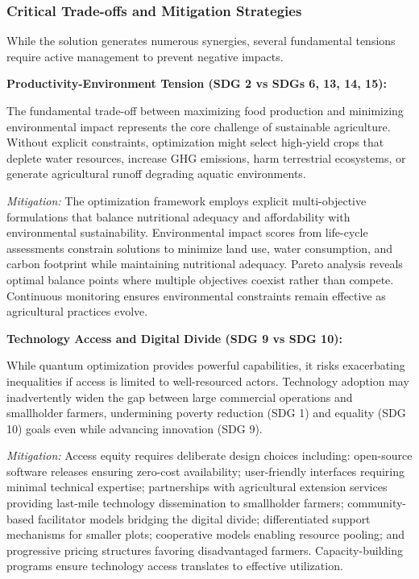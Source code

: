 \documentclass{oqireport}
\begin{document}
\subsubsection{Critical Trade-offs and Mitigation Strategies}

While the solution generates numerous synergies, several fundamental tensions require active management to prevent negative impacts.

\textbf{Productivity-Environment Tension (SDG 2 vs SDGs 6, 13, 14, 15):}

The fundamental trade-off between maximizing food production and minimizing environmental impact represents the core challenge of sustainable agriculture. Without explicit constraints, optimization might select high-yield crops that deplete water resources, increase GHG emissions, harm terrestrial ecosystems, or generate agricultural runoff degrading aquatic environments.

\textit{Mitigation:} The optimization framework employs explicit multi-objective formulations that balance nutritional adequacy and affordability with environmental sustainability. Environmental impact scores from life-cycle assessments constrain solutions to minimize land use, water consumption, and carbon footprint while maintaining nutritional adequacy. Pareto analysis reveals optimal balance points where multiple objectives coexist rather than compete. Continuous monitoring ensures environmental constraints remain effective as agricultural practices evolve.

\textbf{Technology Access and Digital Divide (SDG 9 vs SDG 10):}

While quantum optimization provides powerful capabilities, it risks exacerbating inequalities if access is limited to well-resourced actors. Technology adoption may inadvertently widen the gap between large commercial operations and smallholder farmers, undermining poverty reduction (SDG 1) and equality (SDG 10) goals even while advancing innovation (SDG 9).

\textit{Mitigation:} Access equity requires deliberate design choices including: open-source software releases ensuring zero-cost availability; user-friendly interfaces requiring minimal technical expertise; partnerships with agricultural extension services providing last-mile technology dissemination to smallholder farmers; community-based facilitator models bridging the digital divide; differentiated support mechanisms for smaller plots; cooperative models enabling resource pooling; and progressive pricing structures favoring disadvantaged farmers. Capacity-building programs ensure technology access translates to effective utilization.
\end{document}
